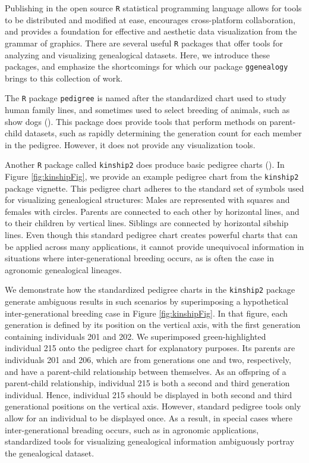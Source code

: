 \documentclass[11pt,a4paper,oldfontcommands,openany]{memoir}
\numberwithin{equation}{section} %
\newcommand{\pkg}[1]{{\texttt{#1}}}
\begin{document}
Publishing in the open source \pkg{R} statistical programming language allows for tools to be distributed and modified at ease, encourages cross-platform collaboration, and provides a foundation for effective and aesthetic data visualization from the grammar of graphics. There are several useful \pkg{R} packages that offer tools for analyzing and visualizing genealogical datasets. Here, we introduce these packages, and emphasize the shortcomings for which our package \pkg{ggenealogy} brings to this collection of work.

The \pkg{R} package \pkg{pedigree} is named after the standardized chart used to study human family lines, and sometimes used to select breeding of animals, such as show dogs (\citealt{ped}). This package does provide tools that perform methods on parent-child datasets, such as rapidly determining the generation count for each member in the pedigree. However, it does not provide any visualization tools.

Another \pkg{R} package called \pkg{kinship2} does produce basic pedigree charts (\citealt{kin}). In Figure \ref{fig:kinshipFig}, we provide an example pedigree chart from the \pkg{kinship2} package vignette. This pedigree chart adheres to the standard set of symbols used for visualizing genealogical structures: Males are represented with squares and females with circles. Parents are connected to each other by horizontal lines, and to their children by vertical lines. Siblings are connected by horizontal sibship lines. Even though this standard pedigree chart creates powerful charts that can be applied across many applications, it cannot provide unequivocal information in situations where inter-generational breeding occurs, as is often the case in agronomic genealogical lineages.

We demonstrate how the standardized pedigree charts in the \pkg{kinship2} package generate ambiguous results in such scenarios by superimposing a hypothetical inter-generational breeding case in Figure \ref{fig:kinshipFig}. In that figure, each generation is defined by its position on the vertical axis, with the first generation containing individuals 201 and 202. We superimposed green-highlighted individual 215 onto the pedigree chart for explanatory purposes. Its parents are individuals 201 and 206, which are from generations one and two, respectively, and have a parent-child relationship between themselves. As an offspring of a parent-child relationship, individual 215 is both a second and third generation individual. Hence, individual 215 should be displayed in both second and third generational positions on the vertical axis. However, standard pedigree tools only allow for an individual to be displayed once. As a result, in special cases where inter-generational breading occurs, such as in agronomic applications, standardized tools for visualizing genealogical information ambiguously portray the genealogical dataset.
\end{document}
